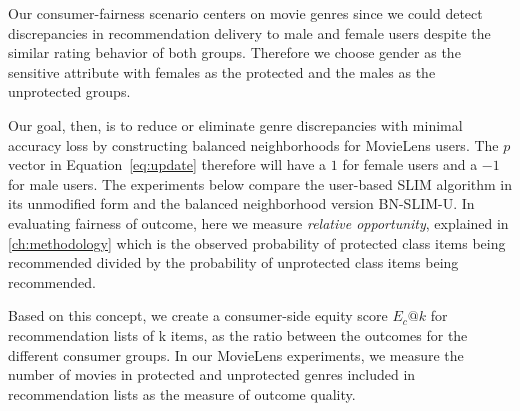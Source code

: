 Our consumer-fairness scenario centers on movie genres since we could detect discrepancies in recommendation delivery to male and female users despite the similar rating behavior of both groups. Therefore we choose gender as the sensitive attribute with females as the protected and the males as the unprotected groups.



Our goal, then, is to reduce or eliminate genre discrepancies with minimal accuracy loss by constructing balanced neighborhoods for MovieLens users. The $p$ vector in Equation~\ref{eq:update} therefore will have a $1$ for female users and a $-1$ for male users. The experiments below compare the user-based SLIM algorithm in its unmodified form and the balanced neighborhood version BN-SLIM-U. In evaluating fairness of outcome, here we measure \textit{relative opportunity}, explained in \ref{ch:methodology} which is the observed probability of protected class items being recommended divided by the probability of unprotected class items being recommended.

Based on this concept, we create a consumer-side equity score $E_c@k$ for recommendation lists of k items, as the ratio between the outcomes for the different consumer groups. In our MovieLens experiments, we measure the number of movies in protected and unprotected genres included in recommendation lists as the measure of outcome quality. 

